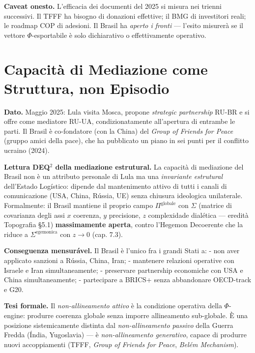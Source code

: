 \Conj{} \textbf{Caveat onesto.} L'efficacia dei documenti del 2025 si
misura nei trienni successivi. Il TFFF ha bisogno di donazioni
effettive; il BMG di investitori reali; le roadmap COP di adesioni. Il
Brasil ha \emph{aperto i fronti} --- l'esito misurerà se il vettore
\(\Phi\)-esportabile è solo dichiarativo o effettivamente operativo.



\section{Capacità di Mediazione come Struttura, non
Episodio}\label{capacituxe0-di-mediazione-come-struttura-non-episodio}

\Proved{} \textbf{Dato.} Maggio 2025: Lula visita Mosca, propone
\emph{strategic partnership} RU-BR e si offre come mediatore RU-UA,
condizionatamente all'apertura di entrambe le parti. Il Brasil è
co-fondatore (con la China) del \emph{Group of Friends for Peace} (gruppo
amici della pace), che ha pubblicato un piano in sei punti per il
conflitto ucraino (2024).

\Hypoth{} \textbf{Lettura DEQ$^2$ della mediazione estrutural.} La
capacità di mediazione del Brasil non è un attributo personale di Lula
ma una \emph{invariante estrutural} dell'Estado Logístico: dipende dal
mantenimento attivo di tutti i canali di comunicazione (USA, China,
Rússia, UE) senza chiusura ideologica unilaterale. Formalmente: il
Brasil mantiene il proprio campo \(\Pi^{\text{globale}}\) con
\(\Sigma\) (matrice di covarianza degli assi \(x\) coerenza, \(y\)
precisione, \(z\) complexidade dialética --- eredità Topografia \S{}5.1)
\textbf{massimamente aperta}, contro l'Hegemon Decoerente che la riduce
a \(\Sigma^{\text{egemonica}}\) con \(z \to 0\) (cap. 7.3).

\Proved{} \textbf{Conseguenza mensurável.} Il Brasil è l'unico fra i
grandi Stati a: - non aver applicato sanzioni a Rússia, China, Iran; -
mantenere relazioni operative con Israele e Iran simultaneamente; -
preservare partnership economiche con USA e China simultaneamente; -
partecipare a BRICS+ senza abbandonare OECD-track e G20.

\Hypoth{} \textbf{Tesi formale.} Il \emph{non-allineamento attivo} è la
condizione operativa della \(\Phi\)-engine: produrre coerenza globale
senza imporre allineamento sub-globale. È una posizione sistemicamente
distinta dal \emph{non-allineamento passivo} della Guerra Fredda (Índia,
Yugoslavia) --- è \emph{non-allineamento generativo}, capace di produrre
nuovi accoppiamenti (TFFF, \emph{Group of Friends for Peace},
\emph{Belém Mechanism}).



